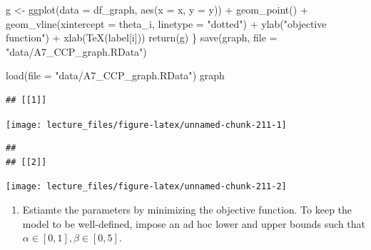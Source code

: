 \documentclass[
]{book}
\newenvironment{Shaded}{\begin{snugshade}}{\end{snugshade}}
\newcommand{\AttributeTok}[1]{\textcolor[rgb]{0.77,0.63,0.00}{#1}}
\newcommand{\FunctionTok}[1]{\textcolor[rgb]{0.00,0.00,0.00}{#1}}
\newcommand{\NormalTok}[1]{#1}
\newcommand{\OtherTok}[1]{\textcolor[rgb]{0.56,0.35,0.01}{#1}}
\newcommand{\SpecialCharTok}[1]{\textcolor[rgb]{0.00,0.00,0.00}{#1}}
\newcommand{\StringTok}[1]{\textcolor[rgb]{0.31,0.60,0.02}{#1}}
\providecommand{\tightlist}{%
  \setlength{\itemsep}{0pt}\setlength{\parskip}{0pt}}
\begin{document}
\begin{Shaded}
\begin{Highlighting}[]
\NormalTok{  g }\OtherTok{\textless{}{-}} \FunctionTok{ggplot}\NormalTok{(}\AttributeTok{data =}\NormalTok{ df\_graph, }\FunctionTok{aes}\NormalTok{(}\AttributeTok{x =}\NormalTok{ x, }\AttributeTok{y =}\NormalTok{ y)) }\SpecialCharTok{+} 
    \FunctionTok{geom\_point}\NormalTok{() }\SpecialCharTok{+}
    \FunctionTok{geom\_vline}\NormalTok{(}\AttributeTok{xintercept =}\NormalTok{ theta\_i, }\AttributeTok{linetype =} \StringTok{"dotted"}\NormalTok{) }\SpecialCharTok{+}
    \FunctionTok{ylab}\NormalTok{(}\StringTok{"objective function"}\NormalTok{) }\SpecialCharTok{+} \FunctionTok{xlab}\NormalTok{(}\FunctionTok{TeX}\NormalTok{(label[i]))}
  \FunctionTok{return}\NormalTok{(g)}
\NormalTok{\}}
\FunctionTok{save}\NormalTok{(graph, }\AttributeTok{file =} \StringTok{"data/A7\_CCP\_graph.RData"}\NormalTok{)}
\end{Highlighting}
\end{Shaded}

\begin{Shaded}
\begin{Highlighting}[]
\FunctionTok{load}\NormalTok{(}\AttributeTok{file =} \StringTok{"data/A7\_CCP\_graph.RData"}\NormalTok{)}
\NormalTok{graph}
\end{Highlighting}
\end{Shaded}

\begin{verbatim}
## [[1]]
\end{verbatim}

\begin{center}\texttt{[image: lecture\_files/figure-latex/unnamed-chunk-211-1]} \end{center}

\begin{verbatim}
## 
## [[2]]
\end{verbatim}

\begin{center}\texttt{[image: lecture\_files/figure-latex/unnamed-chunk-211-2]} \end{center}

\begin{enumerate}
\def\labelenumi{\arabic{enumi}.}
\setcounter{enumi}{3}
\tightlist
\item
  Estiamte the parameters by minimizing the objective function. To keep the model to be well-defined, impose an ad hoc lower and upper bounds such that \(\alpha \in [0, 1], \beta \in [0, 5]\).
\end{enumerate}
\end{document}
